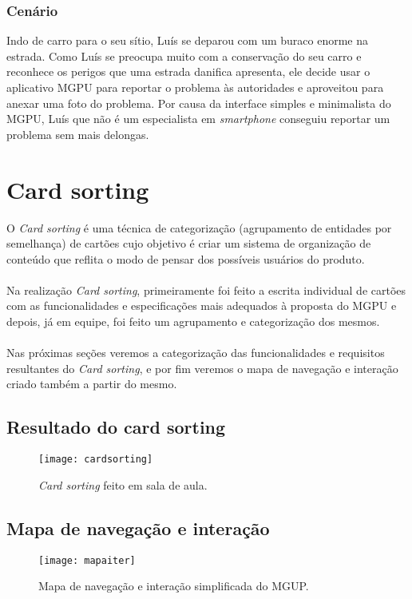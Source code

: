 \documentclass[a4paper,12pt,twoside]{report}
\begin{document}
\subsection{Cenário}
Indo de carro para o seu sítio, Luís se deparou com um buraco enorme na estrada. Como Luís se preocupa muito com a conservação do seu carro e reconhece os perigos que uma estrada danifica apresenta, ele decide usar o aplicativo MGPU para reportar o problema às autoridades e aproveitou para anexar uma foto do problema. Por causa da interface simples e minimalista do MGPU, Luís que não é um especialista em \textit{smartphone} conseguiu reportar um problema sem mais delongas.

\chapter{Card sorting}
O \textit{Card sorting} é uma técnica de categorização (agrupamento de entidades por semelhança) de cartões cujo objetivo é criar um sistema de organização de conteúdo que reflita o modo de pensar dos possíveis usuários do produto.\cite{R0}
\\~\\
Na realização \textit{Card sorting}, primeiramente foi feito a escrita individual de cartões com as funcionalidades e especificações mais adequados à proposta do MGPU e depois, já em equipe, foi feito um agrupamento e categorização dos mesmos.
\\~\\
Nas próximas seções veremos a categorização das funcionalidades e requisitos resultantes do \textit{Card sorting}, e por fim veremos o mapa de navegação e interação criado também a partir do mesmo.
\section{Resultado do card sorting}
\begin{figure}[!ht]
\centering
\texttt{[image: cardsorting]}
\caption{\textit{Card sorting} feito em sala de aula.}
\end{figure}

\clearpage

\section{Mapa de navegação e interação}
\begin{figure}[!ht]
\centering
\texttt{[image: mapaiter]}
\caption{Mapa de navegação e interação simplificada do MGUP.}
\end{figure}
\end{document}
